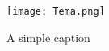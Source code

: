 \begin{figure}[ht!]
\centering
\texttt{[image: Tema.png]}
\caption{A simple caption}
\label{overflow}
\end{figure}
